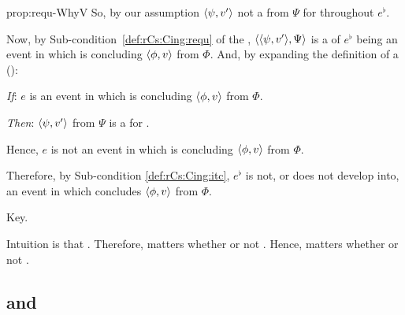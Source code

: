 \begin{note}
\begin{argument}{prop:requ-WhyV}
    \noindent%
    So, by our assumption \(\langle \psi, v' \rangle\) not a  from \(\Psi\) for \vAgent{} throughout \(e^{\flat}\).

    Now, by Sub-condition~\ref{def:rCs:Cing:requ} of the \rCon{}, \(\langle \langle \psi, v' \rangle, \Psi \rangle\) is a \requ{} of \(e^{\flat}\) being an event in which \vAgent{} is concluding \(\langle \phi, v \rangle\) from \(\Phi\).
    And, by expanding the definition of a \requ{} ():

    \begin{itenum}
    \item[\emph{If}:]
      \(e\) is an event in which \vAgent{} is concluding \(\langle \phi, v \rangle\) from \(\Phi\).
    \item[\emph{Then}:]
      \(\langle \psi, v' \rangle\) from \(\Psi\) is a \fc{} for \vAgent{}.
    \end{itenum}

    \noindent%
    Hence, \(e\) is not an event in which \vAgent{} is concluding \(\langle \phi, v \rangle\) from \(\Phi\).

    Therefore, by Sub-condition \ref{def:rCs:Cing:itc}, \(e^{\flat}\) is not, or does not develop into, an event in which \vAgent{} concludes \(\langle \phi, v \rangle\) from \(\Phi\).
  \end{argument}
\end{note}

\begin{note}
  Key.

  Intuition is that \tC{}.
  Therefore, matters whether or not \fc{}.
  Hence, matters whether or not \ros{}.
\end{note}

\subsection{ and \issueConstraint{}}
\label{cha:binding:sec:requ-iC}

